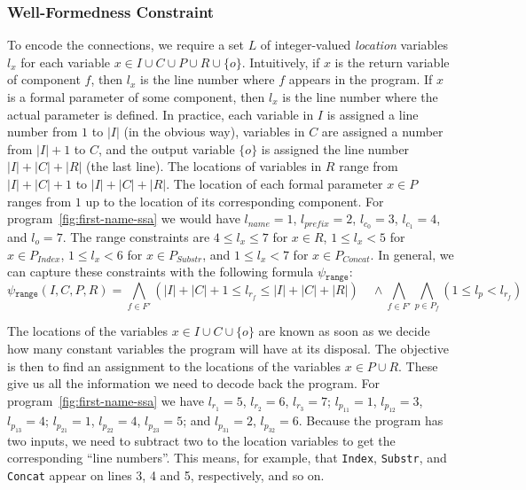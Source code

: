 \subsubsection{Well-Formedness Constraint}
\label{sec:wfp-constraint}

To encode the connections, we require a set $L$ of integer-valued
\textit{location} variables $l_x$ for each variable $x \in I \cup C \cup P \cup
R \cup \{o\}$. Intuitively, if $x$ is the return variable of component $f$, then
$l_x$ is the line number where $f$ appears in the program. If $x$ is a formal
parameter of some component, then $l_x$ is the line number where the actual
parameter is defined. In practice, each variable in $I$ is assigned a line
number from $1$ to $|I|$ (in the obvious way), variables in $C$ are assigned
a number from $|I| + 1$ to $C$, and the output variable $\{o\}$ is assigned the
line number $|I| + |C| + |R|$ (the last line). The locations of variables in $R$
range from $|I| + |C| + 1$ to $|I| + |C| + |R|$. The location of each formal
parameter $x \in P$ ranges from $1$ up to the location of its corresponding
component.
For program~\ref{fig:first-name-ssa} we would have
$l_{name} = 1$, $l_{prefix} = 2$,
$l_{c_0} = 3$, $l_{c_1} = 4$,
and $l_o = 7$.
The range constraints are
$4 \leq l_x \leq 7$ for $x \in R$,
$1 \leq l_x < 5$ for $x \in P_{Index}$,
$1 \leq l_x < 6$ for $x \in P_{Substr}$, and
$1 \leq l_x < 7$ for $x \in P_{Concat}$.
In general, we can capture these constraints with the following formula
$\psi{}_{\mathtt{range}}$:
%
\[
  \psi{}_{\mathtt{range}}(I, C, P, R) =
  \bigwedge_{f \in F'} (|I| + |C| + 1 \leq l_{r_f} \leq |I| + |C| + |R|)
  \quad \wedge
  \bigwedge_{f \in F'}
  \bigwedge_{p \in P_f} (1 \leq l_p < l_{r_f})
\]

The locations of the variables $x \in I \cup C \cup \{o\}$ are known as soon as
we decide how many constant variables the program will have at its disposal. The
objective is then to find an assignment to the locations of the variables $x \in
P \cup R$. These give us all the information we need to decode back the program.
For program~\ref{fig:first-name-ssa} we have
$l_{r_1} = 5$, $l_{r_2} = 6$, $l_{r_3} = 7$; $l_{p_{11}} = 1$, $l_{p_{12}} = 3$,
$l_{p_{13}} = 4$; $l_{p_{21}} = 1$, $l_{p_{22}} = 4$, $l_{p_{23}} = 5$; and
$l_{p_{31}} = 2$, $l_{p_{32}} = 6$. Because the program has two inputs, we need
to subtract two to the location variables to get the corresponding ``line
numbers''. This means, for example, that \lstinline{Index}, \lstinline{Substr},
and \lstinline{Concat} appear on lines 3, 4 and 5, respectively, and so on.

